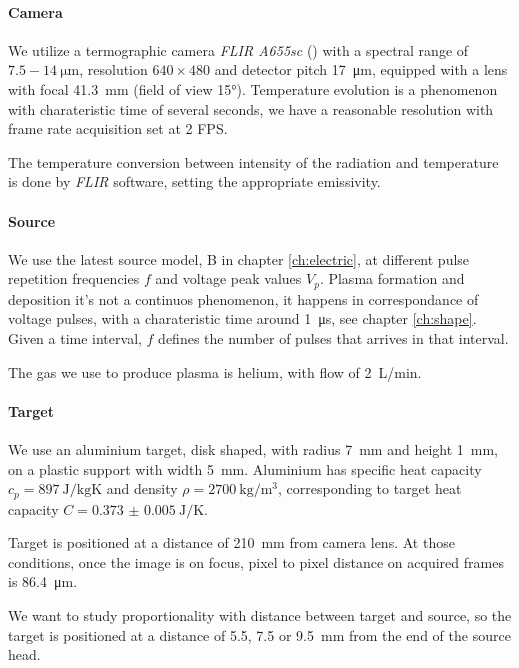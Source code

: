 \paragraph{Camera}
We utilize a termographic camera \emph{FLIR A655sc} (\cite{flircamera}) with a spectral range of $\num{7.5}-\SI{14}{\micro\meter}$, resolution $\num{640}\times\num{480}$ and detector pitch \SI{17}{\micro\meter}, equipped with a lens with focal \SI{41.3}{\milli\meter} (field of view \ang{15}).
Temperature evolution is a phenomenon with charateristic time of several seconds, we have a reasonable resolution with frame rate acquisition set at \num{2} FPS.

The temperature conversion between intensity of the radiation and temperature is done by \emph{FLIR} software, setting the appropriate emissivity.

\paragraph{Source}
We use the latest source model, B in chapter \ref{ch:electric}, at different pulse repetition frequencies $f$ and voltage peak values $V_p$. Plasma formation and deposition it's not a continuos phenomenon, it happens in correspondance of voltage pulses, with a charateristic time around \SI{1}{\micro\second}, see chapter \ref{ch:shape}. Given a time interval, $f$ defines the number of pulses that arrives in that interval.

The gas we use to produce plasma is helium, with flow of \SI{2}{\liter/\minute}.

\paragraph{Target}
We use an aluminium target, disk shaped, with radius \SI{7}{\milli\meter} and height \SI{1}{\milli\meter}, on a plastic support with width \SI{5}{\milli\meter}.
Aluminium has specific heat capacity $c_p = \SI{897}{\joule/\kilogram\kelvin}$ and density $\rho = \SI{2700}{\kilogram/\meter^3}$, corresponding to target heat capacity $C = \SI{0.373(5)}{\joule/\kelvin}$.

Target is positioned at a distance of \SI{210}{\milli\meter} from camera lens. At those conditions, once the image is on focus, pixel to pixel distance on acquired frames is \SI{86.4}{\micro\meter}.

We want to study proportionality with distance between target and source, so the target is positioned at a distance of \num{5.5}, \num{7.5} or \SI{9.5}{\milli\meter} from the end of the source head.

